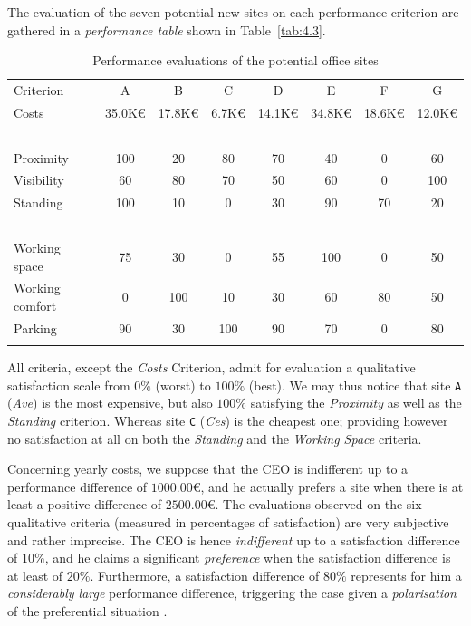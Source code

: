 The evaluation of the seven potential new sites on each performance criterion are gathered in a \emph{performance table} shown in Table~\vref{tab:4.3}.
\begin{table}[ht]
\caption{Performance evaluations of the potential office sites}
\label{tab:4.3}       %
\begin{center}
    \begin{tabular}{l|c|c|c|c|c|c|c}
      \svhline\noalign{\smallskip}
    Criterion  &    A  &      B &       C &       D &       E &        F &        G\\
       \noalign{\smallskip}\hline\noalign{\smallskip}

    Costs      &   35.0K€ &  17.8K€  & 6.7K€  &  14.1K€ &  34.8K€ &  18.6K€ &  12.0K€\\
    \          &   \      &  \     &   \     &   \    &    \    &    \    &    \ \\
    Proximity     &   100    &  20 &      80    &   70    &   40    &   0    &    60 \\
    Visibility     &   60     &  80  &     70    &   50    &   60    &   0    &    100 \\
    Standing      &   100   &   10   &    0     &   30    &   90    &   70   &    20 \\
    \           &   \     &   \    &    \     &   \     &   \     &   \    &    \  \\
    Working space      &   75    &   30   &    0     &   55    &   100   &   0    &    50  \\
    Working comfort      &   0     &   100  &    10    &   30    &   60    &   80   &    50 \\
    Parking     &   90    &   30   &    100   &   90    &   70    &   0    &    80 \\
      \noalign{\smallskip}\hline
    \end{tabular}
  \end{center}
\end{table}
All criteria, except the \emph{Costs} Criterion, admit for evaluation a qualitative satisfaction scale from $0\%$ (worst) to $100\%$ (best). We may thus notice that site \texttt{A} (\emph{Ave}) is the most expensive, but also $100\%$ satisfying the \emph{Proximity} as well as the  \emph{Standing} criterion. Whereas site \texttt{C} (\emph{Ces}) is the cheapest one; providing however no satisfaction at all on both the \emph{Standing} and the \emph{Working Space} criteria.

Concerning yearly costs, we suppose that the CEO is indifferent up to a performance difference of $1000.00$€, and he actually prefers a site when there is at least a positive difference of $2500.00$€. The evaluations observed on the six qualitative criteria (measured in percentages of satisfaction) are very subjective and rather imprecise. The CEO is hence \emph{indifferent} up to a satisfaction difference of $10\%$, and he claims a significant \emph{preference} when the satisfaction difference is at least of $20\%$.  Furthermore, a satisfaction difference of $80\%$ represents for him a \emph{considerably large} performance difference, triggering the case given a \emph{polarisation} of the preferential situation \citep{BIS-2013}. 

